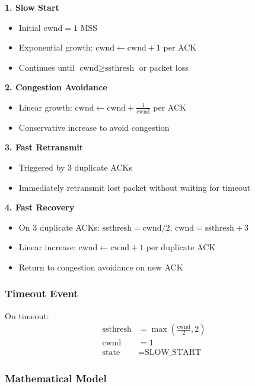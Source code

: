 \documentclass[11pt,a4paper]{article}
\begin{document}
\textbf{1. Slow Start}
\begin{itemize}
    \item Initial $\text{cwnd} = 1$ MSS
    \item Exponential growth: $\text{cwnd} \leftarrow \text{cwnd} + 1$ per ACK
    \item Continues until $\text{cwnd} \geq \text{ssthresh}$ or packet loss
\end{itemize}

\textbf{2. Congestion Avoidance}
\begin{itemize}
    \item Linear growth: $\text{cwnd} \leftarrow \text{cwnd} + \frac{1}{\text{cwnd}}$ per ACK
    \item Conservative increase to avoid congestion
\end{itemize}

\textbf{3. Fast Retransmit}
\begin{itemize}
    \item Triggered by 3 duplicate ACKs
    \item Immediately retransmit lost packet without waiting for timeout
\end{itemize}

\textbf{4. Fast Recovery}
\begin{itemize}
    \item On 3 duplicate ACKs: $\text{ssthresh} = \text{cwnd} / 2$, $\text{cwnd} = \text{ssthresh} + 3$
    \item Linear increase: $\text{cwnd} \leftarrow \text{cwnd} + 1$ per duplicate ACK
    \item Return to congestion avoidance on new ACK
\end{itemize}

\subsubsection{Timeout Event}

On timeout:
\begin{align}
\text{ssthresh} &= \max\left(\frac{\text{cwnd}}{2}, 2\right) \\
\text{cwnd} &= 1 \\
\text{state} &= \text{SLOW\_START}
\end{align}

\subsubsection{Mathematical Model}
\end{document}
